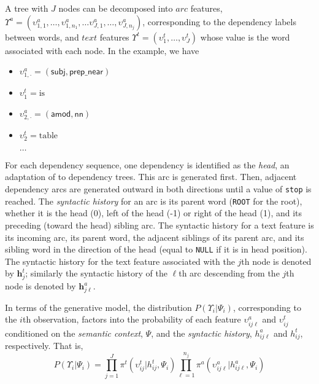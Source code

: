 \documentclass[12pt]{article}
\begin{document}
A tree with $J$ nodes can be decomposed into $arc$ features, $\Upsilon^{a} = (\upsilon_{1,1}^{a}, \dots, \upsilon_{1,n_1}^{a}, \dots \upsilon_{J,1}^{a}, \dots, \upsilon_{J,n_j}^{a})$, corresponding to the dependency labels between words, and $text$ features $\Upsilon^{t} = (\upsilon_1^{t}, \dots, \upsilon_J^{t})$ whose value is the word associated with each node.  In the example, we have
\begin{itemize}
\item $\upsilon_{1,\cdot}^{a} = (\textsf{subj}, \textsf{prep\_near})$
\item $\upsilon_1^{t} = \text{is}$
\item $\upsilon_{2,\cdot}^{a} = (\textsf{amod},\textsf{nn})$
\item $\upsilon_2^{t} = \text{table}$

$\dots$
\end{itemize}

For each dependency sequence, one dependency is identified as the {\it head}, an adaptation of  \cite{collins1997three,collins2003head} to dependency trees.  This arc is generated first.  Then, adjacent dependency arcs are generated outward in both directions until a value of {\tt stop} is reached.  The {\it syntactic history} for an arc is its parent word ({\tt ROOT} for the root), whether it is the head (0), left of the head (-1) or right of the head (1), and its preceding (toward the head) sibling arc.  The syntactic history for a text feature is its incoming arc, its parent word, the adjacent siblings of its parent arc, and its sibling word in the direction of the head (equal to {\tt NULL} if it is in head position).  The syntactic history for the text feature associated with the $j$th node is denoted by $\mathbf{h}^t_{j}$; similarly the syntactic history of the $\ell$th arc descending from the $j$th node is denoted by $\mathbf{h}^a_{j\ell}$.


In terms of the generative model, the distribution $P(\Upsilon_i \vert \Psi_i)$, corresponding to the $i$th observation, factors into the probability of each feature $\upsilon_{ij\ell}^{a}$ and $\upsilon_{ij}^{t}$ conditioned on the {\it semantic context}, $\Psi$, and the {\it syntactic history}, $h^a_{ij\ell}$ and $h^t_{ij}$, respectively.  That is,
\begin{equation}
  \label{eq:1}
  P(\Upsilon_i \vert \Psi_i) = \prod_{j=1}^J \pi^{t}(\upsilon^{t}_{ij} \vert h^t_{ij}, \Psi_i) \prod_{\ell=1}^{n_j} \pi^{a}(\upsilon^{a}_{ij\ell} \vert h^a_{ij\ell}, \Psi_{i}) 
\end{equation}
\end{document}
